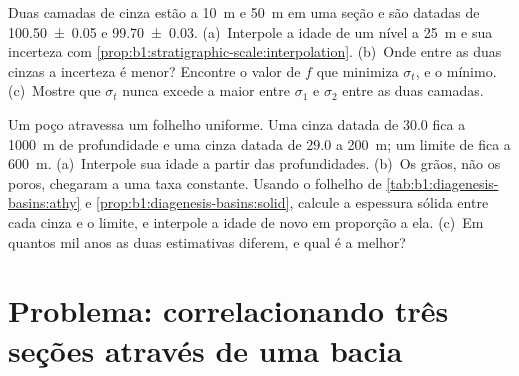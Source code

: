 \begin{exercise}[$\star\star\star$]\label{exo:b1:stratigraphic-scale:11}
Duas camadas de cinza estão a \qty{10}{m} e \qty{50}{m} em uma seção e são datadas de
\qty[uncertainty-mode=separate]{100.50(5)}{\Ma} e \qty[uncertainty-mode=separate]{99.70(3)}{\Ma}.
(a)~Interpole a idade de um nível a \qty{25}{m} e sua incerteza com
\cref{prop:b1:stratigraphic-scale:interpolation}. (b)~Onde entre as duas cinzas a incerteza é
menor? Encontre o valor de $f$ que minimiza $\sigma_t$, e o mínimo. (c)~Mostre que $\sigma_t$
nunca excede a maior entre $\sigma_1$ e $\sigma_2$ entre as duas camadas.
\end{exercise}

\begin{exercise}[$\star\star\star$]\label{exo:b1:stratigraphic-scale:12}
Um poço atravessa um folhelho uniforme. Uma cinza datada de \qty{30.0}{\Ma} fica a
\qty{1000}{m} de profundidade e uma cinza datada de \qty{29.0}{\Ma} a \qty{200}{m}; um limite de
 fica a \qty{600}{m}. (a)~Interpole sua idade a partir das profundidades. (b)~Os grãos, não
os poros, chegaram a uma taxa constante. Usando o folhelho de
\cref{tab:b1:diagenesis-basins:athy} e \cref{prop:b1:diagenesis-basins:solid}, calcule a
espessura sólida entre cada cinza e o limite, e interpole a idade de novo em proporção a ela.
(c)~Em quantos mil anos as duas estimativas diferem, e qual é a melhor?
\end{exercise}

\section{Problema: correlacionando três seções através de uma bacia}

